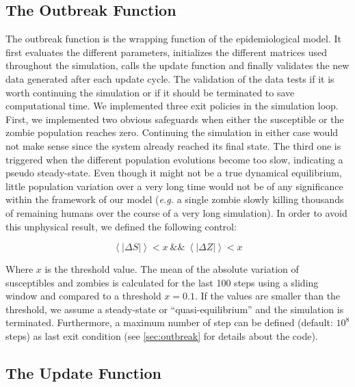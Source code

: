 \documentclass[11pt]{article} %
\begin{document}
\subsection{The Outbreak Function}\indent
\label{outbreakimpl}

The outbreak function is the wrapping function of the epidemiological model. It first evaluates the different parameters, initializes the different matrices used throughout the simulation, calls the update function and finally validates the new data generated after each update cycle. The validation of the data tests if it is worth continuing the simulation or if it should be terminated to save computational time. We implemented three exit policies in the simulation loop. First, we implemented two obvious safeguards when either the susceptible or the zombie population reaches zero. Continuing the simulation in either case would not make sense since the system already reached its final state. The third one is triggered when the different population evolutions become too slow, indicating a pseudo steady-state. Even though it might not be a true dynamical equilibrium, little population variation over a very long time would not be of any significance within the framework of our model (\textit{e.g.} a single zombie slowly killing thousands of remaining humans over the course of a very long simulation). In order to avoid this unphysical result, we defined the following control:

\bigskip
\begin{equation} \label{eq:outbreakequilibrium}
\left\langle \left| \Delta S \right| \right\rangle < x\ \&\&\ \left\langle\left|\Delta Z \right| \right\rangle < x
\end{equation}
\bigskip

Where $x$ is the threshold value. The mean of the absolute variation of susceptibles and zombies is calculated for the last 100 steps using a sliding window and compared to a threshold $x = 0.1$. If the values are smaller than the threshold, we assume a steady-state or ``quasi-equilibrium'' and the simulation is terminated. Furthermore, a maximum number of step can be defined (default: $10^8$ steps) as last exit condition (see \ref{sec:outbreak} for details about the code).

\subsection{The Update Function}\indent
\end{document}
